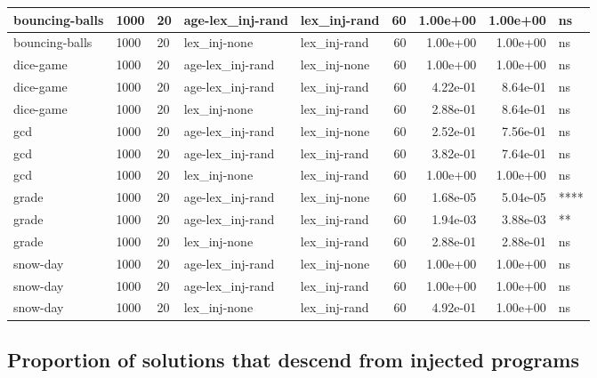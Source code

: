 \documentclass[
]{book}
\begin{document}
\begin{table}
\begin{tabular}[t]{l|l|l|l|l|r|r|r|l}
bouncing-balls & 1000 & 20 & age-lex\_inj-rand & lex\_inj-rand & 60 & 1.00e+00 & 1.00e+00 & ns\\
\hline
bouncing-balls & 1000 & 20 & lex\_inj-none & lex\_inj-rand & 60 & 1.00e+00 & 1.00e+00 & ns\\
\hline
dice-game & 1000 & 20 & age-lex\_inj-rand & lex\_inj-none & 60 & 1.00e+00 & 1.00e+00 & ns\\
\hline
dice-game & 1000 & 20 & age-lex\_inj-rand & lex\_inj-rand & 60 & 4.22e-01 & 8.64e-01 & ns\\
\hline
dice-game & 1000 & 20 & lex\_inj-none & lex\_inj-rand & 60 & 2.88e-01 & 8.64e-01 & ns\\
\hline
gcd & 1000 & 20 & age-lex\_inj-rand & lex\_inj-none & 60 & 2.52e-01 & 7.56e-01 & ns\\
\hline
gcd & 1000 & 20 & age-lex\_inj-rand & lex\_inj-rand & 60 & 3.82e-01 & 7.64e-01 & ns\\
\hline
gcd & 1000 & 20 & lex\_inj-none & lex\_inj-rand & 60 & 1.00e+00 & 1.00e+00 & ns\\
\hline
grade & 1000 & 20 & age-lex\_inj-rand & lex\_inj-none & 60 & 1.68e-05 & 5.04e-05 & ****\\
\hline
grade & 1000 & 20 & age-lex\_inj-rand & lex\_inj-rand & 60 & 1.94e-03 & 3.88e-03 & **\\
\hline
grade & 1000 & 20 & lex\_inj-none & lex\_inj-rand & 60 & 2.88e-01 & 2.88e-01 & ns\\
\hline
snow-day & 1000 & 20 & age-lex\_inj-rand & lex\_inj-none & 60 & 1.00e+00 & 1.00e+00 & ns\\
\hline
snow-day & 1000 & 20 & age-lex\_inj-rand & lex\_inj-rand & 60 & 1.00e+00 & 1.00e+00 & ns\\
\hline
snow-day & 1000 & 20 & lex\_inj-none & lex\_inj-rand & 60 & 4.92e-01 & 1.00e+00 & ns\\
\hline
\end{tabular}
\end{table}

\hypertarget{proportion-of-solutions-that-descend-from-injected-programs}{%
\subsection{Proportion of solutions that descend from injected programs}\label{proportion-of-solutions-that-descend-from-injected-programs}}
\end{document}
